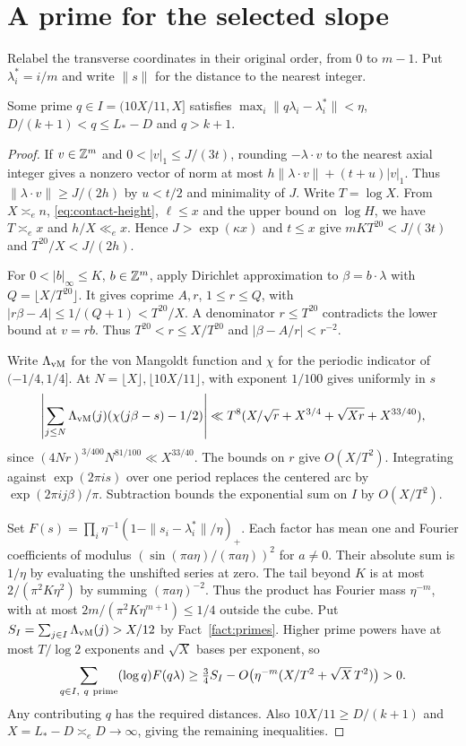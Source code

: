 \section{A prime for the selected slope}\label{sec:hit}

Relabel the transverse coordinates in their original order, from $0$ to $m-1$.
Put $\lambda_i^*=i/m$ and write $\|s\|$ for the distance to the nearest integer.

\begin{lemma}\label{lem:hit}
Some prime $q\in I=(10X/11,X]$ satisfies $\max_i\|q\lambda_i-\lambda_i^*\|<\eta$,
$D/(k+1)<q\le L_*-D$ and $q>k+1$.
\end{lemma}

\begin{proof}
If $v\in\mathbb Z^m$ and $0<|v|_1\le J/(3t)$, rounding $-\lambda\cdot v$
to the nearest axial integer gives a nonzero vector of norm at most
$h\|\lambda\cdot v\|+(t+u)|v|_1$. Thus $\|\lambda\cdot v\|\ge J/(2h)$
by $u<t/2$ and minimality of $J$.
Write $T=\log X$. From $X\asymp_e n$, \eqref{eq:contact-height},
$\ell\le x$ and the upper bound on $\log H$, we have $T\asymp_e x$ and
$h/X\ll_e x$. Hence $J>\exp(\kappa x)$ and $t\le x$ give
$mKT^{20}<J/(3t)$ and $T^{20}/X<J/(2h)$.

For $0<|b|_\infty\le K$, $b\in\mathbb Z^m$, apply Dirichlet approximation to
$\beta=b\cdot\lambda$ with $Q=\lfloor X/T^{20}\rfloor$. It gives
coprime $A,r$, $1\le r\le Q$, with $|r\beta-A|\le1/(Q+1)<T^{20}/X$.
A denominator $r\le T^{20}$ contradicts the lower bound at $v=rb$.
Thus $T^{20}<r\le X/T^{20}$ and $|\beta-A/r|<r^{-2}$.

Write $\Lambda_{\rm vM}$ for the von Mangoldt function and $\chi$ for the
periodic indicator of $(-1/4,1/4]$. At $N=\lfloor X\rfloor,\lfloor10X/11\rfloor$,
\cite[Theorem~3, (15)]{SteudingTechnau} with exponent $1/100$ gives uniformly in $s$
\[
 \left|\sum_{j\le N}\Lambda_{\rm vM}(j)(\chi(j\beta-s)-1/2)\right|
 \ll T^8(X/\sqrt r+X^{3/4}+\sqrt{Xr}+X^{33/40}),
\]
since $(4Nr)^{3/400}N^{81/100}\ll X^{33/40}$.
The bounds on $r$ give $O(X/T^2)$. Integrating against
$\exp(2\pi i s)$ over one period replaces the centered arc by
$\exp(2\pi i j\beta)/\pi$. Subtraction bounds the exponential sum on $I$ by $O(X/T^2)$.

Set $F(s)=\prod_i\eta^{-1}(1-\|s_i-\lambda_i^*\|/\eta)_+$.
Each factor has mean one and Fourier coefficients of modulus
$(\sin(\pi a\eta)/(\pi a\eta))^2$ for $a\ne0$. Their absolute sum is
$1/\eta$ by evaluating the unshifted series at zero. The tail beyond $K$
is at most $2/(\pi^2K\eta^2)$ by summing $(\pi a\eta)^{-2}$.
Thus the product has Fourier mass $\eta^{-m}$, with at most
$2m/(\pi^2K\eta^{m+1})\le1/4$ outside the cube. Put
$S_I=\sum_{j\in I}\Lambda_{\rm vM}(j)>X/12$ by Fact~\ref{fact:primes}.
Higher prime powers have at most $T/\log 2$ exponents and $\sqrt X$ bases per exponent, so
\[
 \sum_{q\in I,\ q\ {\rm prime}}(\log q)F(q\lambda)
 \ge \tfrac34 S_I-O\bigl(\eta^{-m}(X/T^2+\sqrt X\,T^2)\bigr)>0 .
\]
Any contributing $q$ has the required distances. Also $10X/11\ge D/(k+1)$
and $X=L_*-D\asymp_e D\to\infty$, giving the remaining inequalities.
\end{proof}
